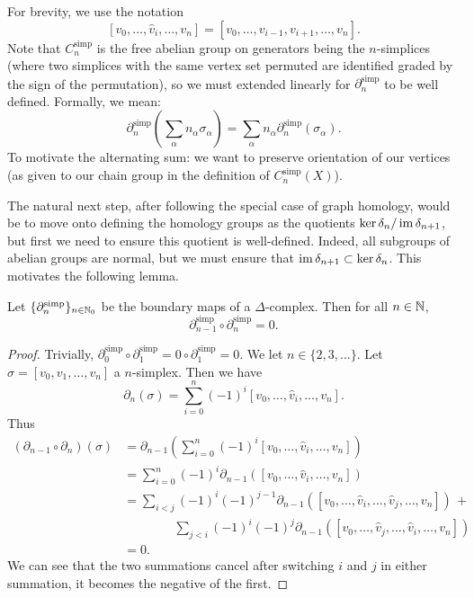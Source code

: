 For brevity, we use the notation
\[ [v_0, \ldots, \hat v_i, \ldots, v_n] = [v_0, \ldots, v_{i-1}, v_{i+1}, \ldots, v_n]. \]
Note that $C_n^\text{simp}$ is the free abelian group on generators being the $n$-simplices (where two simplices with the same vertex set permuted are identified graded by the sign of the permutation), so we must extended linearly for $\partial_n^\text{simp}$ to be well defined. Formally, we mean:
\[
  \partial_n^\text{simp}\left(\sum_\alpha n_\alpha \sigma_\alpha\right) = \sum_\alpha n_\alpha \partial_n^\text{simp} (\sigma_\alpha).
\]
To motivate the alternating sum: we want to preserve orientation of our vertices (as given to our chain group in the definition of $C_n^\text{simp}(X)$). 

The natural next step, after following the special case of graph homology, would be to move onto defining the homology groups as the quotients $\ker \delta_n/\operatorname{im} \delta_{n+1}$, but first we need to ensure this quotient is well-defined. Indeed, all subgroups of abelian groups are normal, but we must ensure that $\operatorname{im} \delta_{n+1} \subset \ker \delta_n$. This motivates the following lemma.

\begin{lemma}
  Let $\{\partial_n^\text{simp}\}_{n \in \mathbb{N}_0}$ be the boundary maps of a $\Delta$-complex. Then for all $n \in \mathbb{N}$,
  \[ \partial_{n-1}^\text{simp} \circ \partial_{n}^\text{simp} = 0. \]
\end{lemma}

\begin{proof}
  Trivially, $\partial_0^\text{simp} \circ \partial_1^\text{simp} = 0 \circ \partial_1^\text{simp} = 0$. We let $n \in \{2, 3, \ldots\}$. Let $\sigma = [v_0, v_1, \ldots, v_n]$ a $n$-simplex. Then we have \[\partial_n(\sigma) = \sum_{i=0}^n (-1)^i [v_0, \ldots, \hat v_i, \ldots, v_n].\] Thus
  \begin{align*}
    (\partial_{n-1} \circ \partial_n)(\sigma) & = \partial_{n-1} \left(\sum_{i=0}^n (-1)^i [v_0, \ldots, \hat v_i, \ldots, v_n]\right)                     \\
                                              & = \sum_{i=0}^n (-1)^i \partial_{n-1}([v_0, \ldots, \hat v_i, \ldots, v_n])                                 \\
                                              & = \sum_{i < j} (-1)^i (-1)^{j-1} \partial_{n-1}([v_0, \ldots, \hat v_i, \ldots, \hat v_j, \ldots, v_n])\,+ \\ &\qquad\qquad \sum_{j < i} (-1)^i (-1)^{j} \partial_{n-1}([v_0, \ldots, \hat v_j, \ldots, \hat v_i, \ldots, v_n]) \\
                                              & = 0.
  \end{align*}
  We can see that the two summations cancel after switching $i$ and $j$ in either summation, it becomes the negative of the first.
\end{proof}

